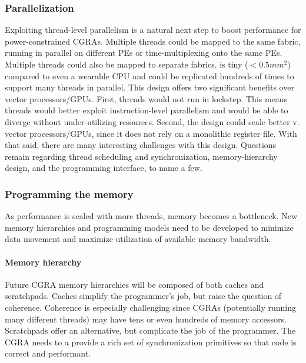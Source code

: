 \subsubsection{Parallelization}
Exploiting thread-level parallelism is a natural next step to boost performance for power-constrained CGRAs.
% 
Multiple threads could be mapped to the same fabric, running in parallel on different PEs or time-multiplexing onto the same PEs.
%
Multiple threads could also be mapped to separate fabrics. 
% 
\riptide is tiny ($<0.5mm^2$) compared to even a wearable CPU and could be replicated hundreds of times to support many threads in parallel.
% 
This design offers two significant benefits over vector processors/GPUs.
% 
First, threads would not run in lockstep.
This means threads would better exploit instruction-level parallelism and would be able to diverge without under-utilizing resources.
Second, the design could scale better v. vector processors/GPUs, since it does not rely on a monolithic register file.
% 
With that said, there are many interesting challenges with this design.
% 
Questions remain regarding thread scheduling and synchronization, memory-hierarchy design, and the programming interface, to name a few.

\subsubsection{Programming the memory}
As performance is scaled with more threads, memory becomes a bottleneck.
% 
New memory hierarchies and programming models need to be developed to minimize data movement and maximize utilization of available memory bandwidth.

\paragraph{Memory hierarchy}
Future CGRA memory hierarchies will be composed of both caches and scratchpads.
% 
Caches simplify the programmer's job, but raise the question of coherence.
% 
Coherence is especially challenging since CGRAs (potentially running many different threads) may have tens or even hundreds of memory accessors.
% 
Scratchpads offer an alternative, but complicate the job of the programmer.
% 
The CGRA needs to a provide a rich set of synchronization primitives so that code is correct and performant.

